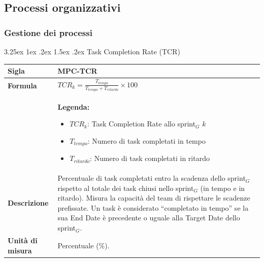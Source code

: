 \documentclass[a4paper, 10pt]{article}
\makeatletter
\renewcommand\paragraph{\@startsection{paragraph}{4}{\z@}%
  {3.25ex \@plus1ex \@minus .2ex}%
  {1.5ex \@plus .2ex}%
  {\normalfont\normalsize\bfseries}}
\makeatother
\begin{document}
\vspace{1cm}

\subsection{Processi organizzativi}

\subsubsection{Gestione dei processi}


\vspace{1cm}


\vspace{1cm}

\paragraph{Task Completion Rate (TCR)}
\mbox{} \\
\noindent
\begin{minipage}{\textwidth}
    \begin{tabularx}{\textwidth}{|>{\columncolor{bluBitless!10}\bfseries}p{3.5cm}|X|}
        \hline
        Sigla & MPC-TCR \\ \hline
        Formula &
        \textit{$TCR_{k} = \frac{T_{tempo}}{T_{tempo} + T_{ritardo}} \times 100$} \vspace{2mm} \\
        & \small \textbf{Legenda:}
        \begin{itemize}
            \item $TCR_{k}$: Task Completion Rate allo sprint$_G$ $k$
            \item $T_{tempo}$: Numero di task completati in tempo
            \item $T_{ritardo}$: Numero di task completati in ritardo
        \end{itemize} \\ \hline
        Descrizione & Percentuale di task completati entro la scadenza dello sprint$_G$ rispetto al totale dei task chiusi nello sprint$_G$ (in tempo e in ritardo). Misura la capacità del team di rispettare le scadenze prefissate. Un task è considerato ``completato in tempo'' se la sua End Date è precedente o uguale alla Target Date dello sprint$_G$. \\ \hline
        Unità di misura & Percentuale (\%). \\ \hline
    \end{tabularx}
\end{minipage}
\end{document}
